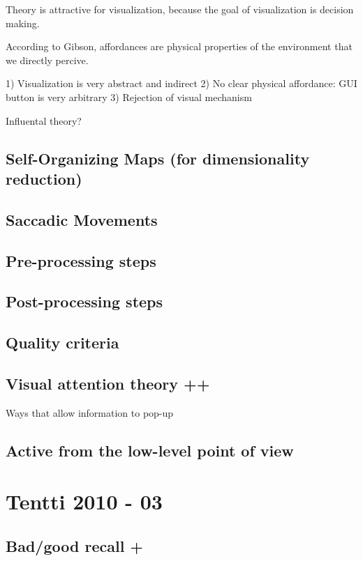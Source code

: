 \documentclass[a4paper]{article}
\begin{document}
Theory is attractive for visualization, because the goal of visualization is decision making. 

According to Gibson, affordances are physical properties of the environment that we directly percive.

1) Visualization is very abstract and indirect
2) No clear physical affordance: GUI button is very arbitrary
3) Rejection of visual mechanism

Influental theory?

\subsection{Self-Organizing Maps (for dimensionality reduction)}

\subsection{Saccadic Movements}

\subsection{Pre-processing steps}

\subsection{Post-processing steps}

\subsection{Quality criteria}

\subsection{Visual attention theory ++}

Ways that allow information to pop-up



\subsection{Active from the low-level point of view}

\section{Tentti 2010 - 03}

\subsection{Bad/good recall +}
\end{document}
